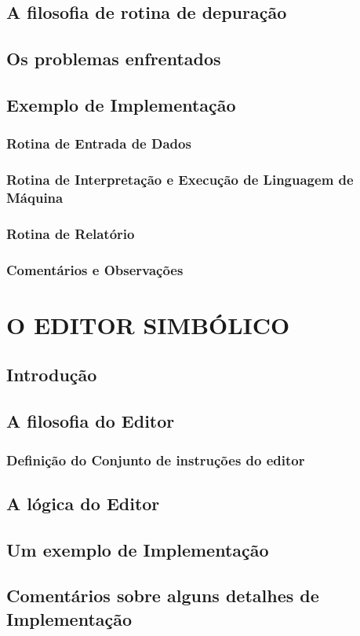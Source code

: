 \documentclass[a4paper,12pt]{article}
\begin{document}
\subsection{A filosofia de rotina de depuração}

\subsection{Os problemas enfrentados}

\subsection{Exemplo de Implementação}
\subsubsection{Rotina de Entrada de Dados}
\subsubsection{Rotina de Interpretação e Execução de Linguagem de Máquina}
\subsubsection{Rotina de Relatório}
\subsubsection{Comentários e Observações}

\section{O EDITOR SIMBÓLICO}
\subsection{Introdução}
\subsection{A filosofia do Editor}
\subsubsection{Definição do Conjunto de instruções do editor}

\subsection{A lógica do Editor}

\subsection{Um exemplo de Implementação}

\subsection{Comentários sobre alguns detalhes de Implementação}
\end{document}
